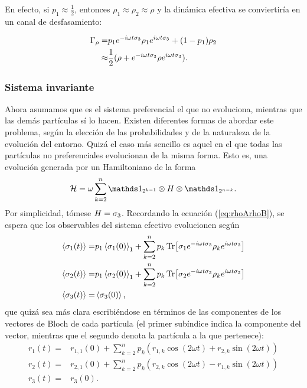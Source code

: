 En efecto, si $p_{1}\approx\frac{1}{2}$, entonces $\rho_{1}\approx\rho_{2}\approx\rho$ y la dinámica efectiva se conviertiría en un canal de desfasamiento:

\begin{align*}
    \Gamma_{\rho}=&p_{1}e^{-i\omega t \sigma_{3}}\rho_{1}e^{i\omega t \sigma_{3}}+(1-p_{1})\rho_{2}\\
    \approx&\frac{1}{2}(\rho+e^{-i\omega t \sigma_{3}}\rho e^{i\omega t \sigma_{3}}).
\end{align*}

\subsubsection{Sistema invariante}

Ahora asumamos que es el sistema preferencial el que no evoluciona, mientras que las demás partículas sí lo hacen. Existen diferentes formas de abordar este problema, según la elección de las probabilidades y de la naturaleza de la evolución del entorno. Quizá el caso más sencillo es aquel en el que todas las partículas no preferenciales evolucionan de la misma forma. Esto es, una evolución generada por un Hamiltoniano de la forma
\begin{equation*}
    \mcH=\omega\sum_{k=2}^{n}\Id_{2^{k-1}}\otimes H \otimes \Id_{2^{n-k}}.
\end{equation*}
Por simplicidad, tómese $H=\sigma_{3}$. Recordando la ecuación (\ref{eq:rhoArhoB}), se espera que los observables del sistema efectivo evolucionen según
\begin{align*}
    \expval{\sigma_{1}(t)}=&p_{1} \expval{\sigma_{1}(0)}_{1}+\sum_{k=2}^{n}p_{k}\Tr[\sigma_{1}e^{-i\omega t\sigma_{3}} \rho_{k} e^{i\omega t\sigma_{3}}]\\
    \expval{\sigma_{2}(t)}=&p_{1} \expval{\sigma_{2}(0)}_{1}+\sum_{k=2}^{n}p_{k}\Tr[\sigma_{2}e^{-i\omega t\sigma_{3}} \rho_{k} e^{i\omega t\sigma_{3}}]\\
    \expval{\sigma_{3}(t)}=&\expval{\sigma_{3}(0)},
\end{align*}
que quizá sea más clara escribiéndose en términos de las componentes de los vectores de Bloch de cada partícula (el primer subíndice indica la componente del vector, mientras que el segundo denota la partícula a la que pertenece):
\begin{align*}
    r_{1}(t)=&r_{1,1}(0)+\sum_{k=2}^{n}p_{k}(r_{1,k}\cos(2\omega t)+r_{2,k}\sin(2\omega t))\\
    r_{2}(t)=&r_{2,1}(0)+\sum_{k=2}^{n}p_{k}(r_{2,k}\cos(2\omega t)-r_{1,k}\sin(2\omega t))\\
    r_{3}(t)=&r_{3}(0).
\end{align*}
